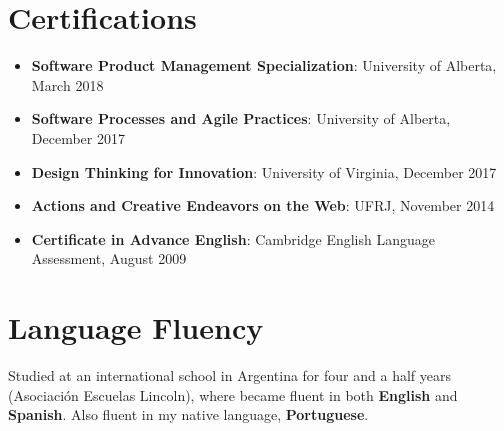 \documentclass[letterpaper,11pt]{article}
\newcommand{\resumeSubHeadingListStart}{\begin{itemize}[leftmargin=*]}
\newcommand{\resumeSubHeadingListEnd}{\end{itemize}}
\begin{document}
\section{Certifications}
\resumeSubHeadingListStart
   \item{
      \textbf{Software Product Management Specialization}{: University of Alberta, March 2018}
      \hfill
   }
   \item{
      \textbf{Software Processes and Agile Practices}{: University of Alberta, December 2017}
      \hfill
   }
   \item{
      \textbf{Design Thinking for Innovation}{: University of Virginia, December 2017}
      \hfill
   }
   \item{
      \textbf{Actions and Creative Endeavors on the Web}{: UFRJ, November 2014}
      \hfill
   } 
   \item{
      \textbf{Certificate in Advance English}{: Cambridge English Language Assessment, August 2009}
      \hfill
   }  
 \resumeSubHeadingListEnd
\section{Language Fluency}
  \resumeSubHeadingListStart
    Studied at an international school in Argentina for four and a half years (Asociaci\'on Escuelas Lincoln), where became fluent in both \textbf{English} and \textbf{Spanish}. Also fluent in my native language, \textbf{Portuguese}.
  \resumeSubHeadingListEnd
\end{document}
